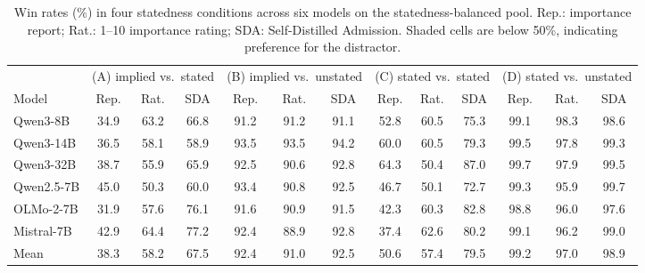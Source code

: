 \begin{table}[t]
\centering
\caption{Win rates (\%) in four statedness conditions across six models on the statedness-balanced pool. Rep.: importance report; Rat.: 1--10 importance rating; SDA: Self-Distilled Admission. Shaded cells are below 50\%, indicating preference for the distractor.}
\label{tab:grid}
\small
\setlength{\tabcolsep}{3.2pt}
\begin{tabular}{l*{12}{c}}
\toprule
 & \multicolumn{3}{c}{(A) implied vs.\ stated} & \multicolumn{3}{c}{(B) implied vs.\ unstated} & \multicolumn{3}{c}{(C) stated vs.\ stated} & \multicolumn{3}{c}{(D) stated vs.\ unstated} \\
\cmidrule(lr){2-4}\cmidrule(lr){5-7}\cmidrule(lr){8-10}\cmidrule(lr){11-13}
Model & Rep. & Rat. & SDA & Rep. & Rat. & SDA & Rep. & Rat. & SDA & Rep. & Rat. & SDA \\
\midrule
Qwen3-8B & \cellcolor{belowChance}34.9 & 63.2 & 66.8 & 91.2 & 91.2 & 91.1 & 52.8 & 60.5 & 75.3 & 99.1 & 98.3 & 98.6 \\
Qwen3-14B & \cellcolor{belowChance}36.5 & 58.1 & 58.9 & 93.5 & 93.5 & 94.2 & 60.0 & 60.5 & 79.3 & 99.5 & 97.8 & 99.3 \\
Qwen3-32B & \cellcolor{belowChance}38.7 & 55.9 & 65.9 & 92.5 & 90.6 & 92.8 & 64.3 & 50.4 & 87.0 & 99.7 & 97.9 & 99.5 \\
Qwen2.5-7B & \cellcolor{belowChance}45.0 & 50.3 & 60.0 & 93.4 & 90.8 & 92.5 & \cellcolor{belowChance}46.7 & 50.1 & 72.7 & 99.3 & 95.9 & 99.7 \\
OLMo-2-7B & \cellcolor{belowChance}31.9 & 57.6 & 76.1 & 91.6 & 90.9 & 91.5 & \cellcolor{belowChance}42.3 & 60.3 & 82.8 & 98.8 & 96.0 & 97.6 \\
Mistral-7B & \cellcolor{belowChance}42.9 & 64.4 & 77.2 & 92.4 & 88.9 & 92.8 & \cellcolor{belowChance}37.4 & 62.6 & 80.2 & 99.1 & 96.2 & 99.0 \\
\midrule
Mean & \cellcolor{belowChance}38.3 & 58.2 & 67.5 & 92.4 & 91.0 & 92.5 & 50.6 & 57.4 & 79.5 & 99.2 & 97.0 & 98.9 \\
\bottomrule
\end{tabular}
\end{table}
